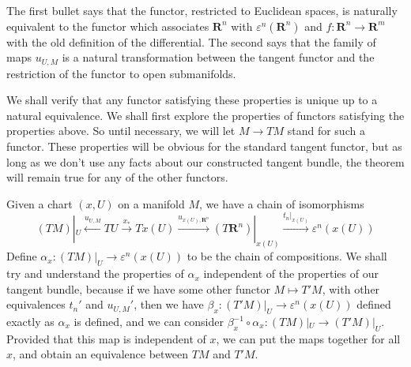 %
The first bullet says that the functor, restricted to Euclidean spaces, is naturally equivalent to the functor which associates $\mathbf{R}^n$ with $\varepsilon^n(\mathbf{R}^n)$ and $f: \mathbf{R}^n \to \mathbf{R}^m$ with the old definition of the differential. The second says that the family of maps $u_{U,M}$ is a natural transformation between the tangent functor and the restriction of the functor to open submanifolds.

We shall verify that any functor satisfying these properties is unique up to a natural equivalence. We shall first explore the properties of functors satisfying the properties above. So until necessary, we will let $M \to TM$ stand for such a functor. These properties will be obvious for the standard tangent functor, but as long as we don't use any facts about our constructed tangent bundle, the theorem will remain true for any of the other functors.

Given a chart $(x,U)$ on a manifold $M$, we have a chain of isomorphisms
%
\[ (TM)|_U \xleftarrow{u_{U,M}} TU \xrightarrow{x_*} Tx(U) \xrightarrow{u_{x(U), \mathbf{R}^n}} (T\mathbf{R}^n)|_{x(U)} \xrightarrow{t_n|_{x(U)}} \varepsilon^n(x(U)) \]
%
Define $\alpha_x: (TM)|_U \to \varepsilon^n(x(U))$ to be the chain of compositions. We shall try and understand the properties of $\alpha_x$ independent of the properties of our tangent bundle, because if we have some other functor $M \mapsto T'M$, with other equivalences $t_n'$ and $u_{U,M}'$, then we have $\beta_x: (T'M)|_U \to \varepsilon^n(x(U))$ defined exactly as $\alpha_x$ is defined, and we can consider $\beta_x^{-1} \circ \alpha_x: (TM)|_U \to (T'M)|_U$. Provided that this map is independent of $x$, we can put the maps together for all $x$, and obtain an equivalence between $TM$ and $T'M$.

